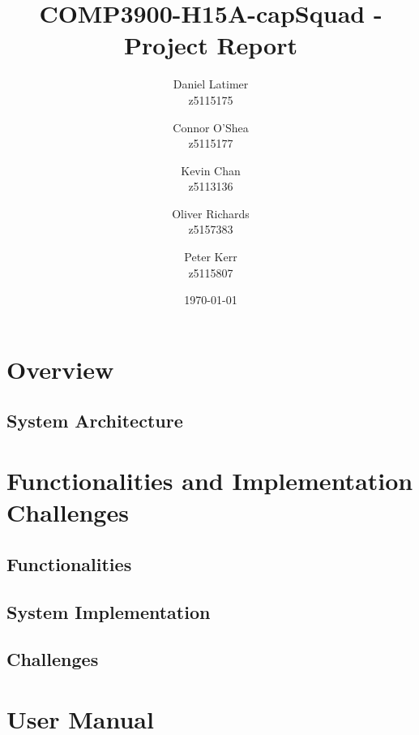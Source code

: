 \documentclass[12pt]{article}
\title{COMP3900-H15A-capSquad - Project Report}
\date{\today}
\author{
    Daniel Latimer \\ z5115175 \and
    Connor O'Shea \\ z5115177 \and
    Kevin Chan \\ z5113136 \and
    Oliver Richards \\ z5157383 \and
    Peter Kerr \\ z5115807}
\begin{document}
\maketitle
\tableofcontents

\newpage


\section{Overview}
\subsection{System Architecture}



\section{Functionalities and Implementation Challenges}

\subsection{Functionalities}

\subsection{System Implementation}


\subsection{Challenges}

\section{User Manual}
\end{document}
